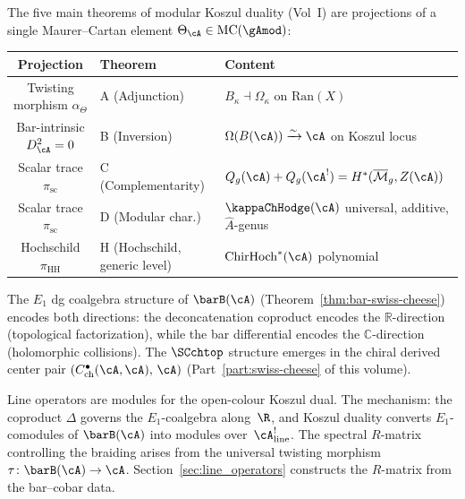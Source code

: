 \begin{construction}
\label{constr:vol2-five-theorems-projections}
The five main theorems of modular Koszul duality (Vol~I) are projections of a single Maurer--Cartan element $\Theta_\cA \in \mathrm{MC}(\gAmod)$:
\begin{center}
\begin{tabular}{cll}
\toprule
Projection & Theorem & Content \\
\midrule
Twisting morphism $\alpha_\Theta$ & A (Adjunction) & $B_\kappa \dashv \Omega_\kappa$ on $\mathrm{Ran}(X)$ \\
Bar-intrinsic $D_\cA^2 = 0$ & B (Inversion) & $\Omega(B(\cA)) \xrightarrow{\sim} \cA$ on Koszul locus \\
Scalar trace $\pi_{\mathrm{sc}}$ & C (Complementarity) & $Q_g(\cA) + Q_g(\cA^!) = H^*(\overline{\mathcal{M}}_g, Z(\cA))$ \\
Scalar trace $\pi_{\mathrm{sc}}$ & D (Modular char.) & $\kappaChHodge(\cA)$ universal, additive, $\hat{A}$-genus \\
Hochschild $\pi_{\mathrm{HH}}$ & H (Hochschild, generic level) & $\mathrm{ChirHoch}^*(\cA)$ polynomial \\
\bottomrule
\end{tabular}
\end{center}
The $E_1$ dg coalgebra structure of $\barB(\cA)$ (Theorem~\ref{thm:bar-swiss-cheese}) encodes both directions: the deconcatenation coproduct encodes the $\mathbb{R}$-direction (topological factorization), while the bar differential encodes the $\mathbb{C}$-direction (holomorphic collisions). The $\SCchtop$ structure emerges in the chiral derived center pair $(C^\bullet_{\mathrm{ch}}(\cA,\cA),\, \cA)$ (Part~\ref{part:swiss-cheese} of this volume).
\end{construction}

\begin{remark}
\label{rem:transition-to-line-operators}
Line operators are modules for the open-colour Koszul dual. The mechanism:
the coproduct $\Delta$ governs the $E_1$-coalgebra along~$\R$,
and Koszul duality converts $E_1$-comodules of $\barB(\cA)$ into
modules over~$\cA^!_{\mathrm{line}}$. The spectral $R$-matrix controlling the
braiding arises from the universal twisting morphism
$\tau\colon \barB(\cA) \to \cA$.
Section~\ref{sec:line_operators} constructs the $R$-matrix from
the bar--cobar data.
\end{remark}

